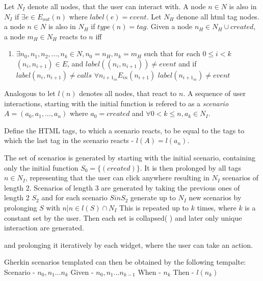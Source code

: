 Let $N_I$ denote all nodes, that the user can interact with. A node $n \in N$ is also in $N_I$ if $\exists e \in E_{out}(n)$ where $label(e) = event$. Let $N_H$ denone all html tag nodes. a node $n \in N$ is also in $N_H$ if $type(n) = tag$. 
Given a node $n_H \in N_H \cup {created}$, a node $m_H \in N_H$ reacts to $n$ iff
\begin{enumerate}
    \item $\exists n_0,n_1,n_2, \ldots,n_k \in N, n_0=n_H,n_k=m_H$ such that for each $0 \leq i < k  $ $(n_i,n_{i+1}) \in E$, and $label((n_i,n_{i+1}))\neq event$ and if $label(n_i,n_{i+1}) \neq calls$ $\forall n_{i+1_{in}} E_{in}(n_{i+1})$ $label(n_{i+1_{in}}) \neq event$ 
\end{enumerate}

Analogous to \cite{zhang2019scenario} let $l(n)$ denotes all nodes, that react to $n$. A sequence of user interactions, starting with the initial function is refered to as a \textit{scenario} $A=(a_0,a_1,\ldots, a_n)$ where $a_0=created$ and $\forall0 < k \leq n, a_k \in N_I$. 

Define the HTML tags, to which a scenario reacts, to be equal to the tags to which the last tag in the scenario reacts 
- $l(A)=l(a_n)$. 


The set of scenarios is generated by starting with the initial scenario, containing only the initial function $S_0 = \{(created)\}$. It is then prolonged by all tags $n \in N_I$, representing that the user can click anywhere resulting in $N_I$ scenarios of length 2. Scenarios of length 3 are generated by taking the previous ones of length 2 $S_2$ and for each scenario $S in S_2$ generate up to $N_I$ new scenarios by prolonging $S$ with $n | n \in l(S) \cap N_I$
This is repeated up to $k$ times, where $k$ is a constant set by the user. Then each set is collapsed(%
) and later only unique interaction are generated.

and prolonging it iteratively by each widget, where the user can take an action.

Gherkin scenarios templated can then be obtained by the following tempalte:
Scenario - $n_0,n_1 \ldots n_k$
Given - $n_0, n_1 \ldots n_{k-1}$
When - $n_k$
Then - $l(n_k)$









